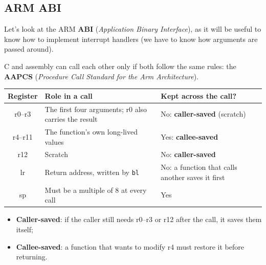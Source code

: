 \documentclass[a4paper,11pt]{article}
\begin{document}
\subsection{ARM ABI}

Let's look at the ARM \textbf{ABI} (\textit{Application Binary Interface}), as it will be useful to know how to implement interrupt handlers (we have to know how arguments are passed around).

C and assembly can call each other only if both follow the same rules: the \textbf{AAPCS} (\textit{Procedure Call Standard for the Arm Architecture}).

\begin{center}
	\begin{tabular}{c|p{5cm}|p{5cm}}
		\hline
		\textbf{Register} & \textbf{Role in a call}                              & \textbf{Kept across the call?}                   \\
		\hline
		r0--r3            & The first four arguments; r0 also carries the result & No: \textbf{caller-saved} (scratch)              \\
		\hline
		r4--r11           & The function's own long-lived values                 & Yes: \textbf{callee-saved}                       \\
		\hline
		r12               & Scratch                                              & No: \textbf{caller-saved}                        \\
		\hline
		lr                & Return address, written by \texttt{bl}               & No: a function that calls another saves it first \\
		\hline
		sp                & Must be a multiple of 8 at every call                & Yes                                              \\
		\hline
	\end{tabular}
\end{center}

\begin{itemize}
	\item \textbf{Caller-saved}: if the caller still needs r0--r3 or r12 after the call, it saves them itself;
	\item \textbf{Callee-saved}: a function that wants to modify r4 must restore it before returning.
\end{itemize}
\end{document}
